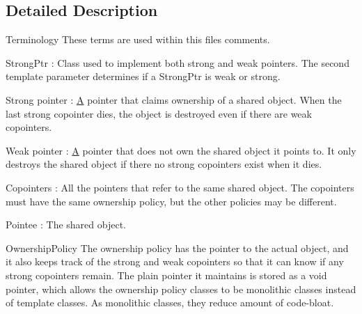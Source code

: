 \subsection{Detailed Description}
\begin{DoxyParagraph}{Terminology}
These terms are used within this file\textquotesingle{}s comments.
\begin{DoxyEnumerate}
\item Strong\+Ptr \+: Class used to implement both strong and weak pointers. The second template parameter determines if a Strong\+Ptr is weak or strong.
\item Strong pointer \+: \hyperlink{structA}{A} pointer that claims ownership of a shared object. When the last strong copointer dies, the object is destroyed even if there are weak copointers.
\item Weak pointer \+: \hyperlink{structA}{A} pointer that does not own the shared object it points to. It only destroys the shared object if there no strong copointers exist when it dies.
\item Copointers \+: All the pointers that refer to the same shared object. The copointers must have the same ownership policy, but the other policies may be different.
\item Pointee \+: The shared object.
\end{DoxyEnumerate}
\end{DoxyParagraph}
\begin{DoxyParagraph}{Ownership\+Policy}
The ownership policy has the pointer to the actual object, and it also keeps track of the strong and weak copointers so that it can know if any strong copointers remain. The plain pointer it maintains is stored as a void pointer, which allows the ownership policy classes to be monolithic classes instead of template classes. As monolithic classes, they reduce amount of code-\/bloat.
\end{DoxyParagraph}
